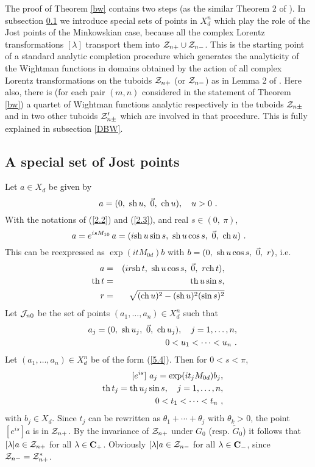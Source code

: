 \documentclass[a4paper,a4paper]{article}
\def\bC{{\bf C}}
\def\th{{\rm th\,}}
\def\ch{{\rm ch\,}}
\def\sh{{\rm sh\,}}
\def\JJ{{\cal J}}
\def\ZZ{{\cal Z}}
\def\wt{\widetilde}
\def\Xdn{X_d^n}
\begin{document}
\vskip 0.2cm
The proof of Theorem \ref{bw} contains two steps (as the similar
Theorem 2 of \cite{BEM}). In subsection \ref{Jostpt} we introduce
special sets of points in $X_d^n$ which play the role of the
Jost points of the Minkowskian case, because
all the complex Lorentz transformations $[\lambda]$
transport them into $\ZZ_{n+}\cup\ZZ_{n-}$.
This is the starting point of a standard analytic
completion procedure which generates the analyticity of the
Wightman functions in domains obtained by the action of all
complex Lorentz transformations on the tuboids
$\ZZ_{n+}$
(or $\ZZ_{n-}$) as in Lemma 2 of \cite{BEM}.
Here also, there is (for each pair $(m,n)$ considered in the statement of
Theorem \ref{bw}) a quartet of Wightman functions analytic
respectively in the tuboids
$\ZZ_{n\pm}$
and in two other tuboids
$\ZZ'_{n\pm}$
which are involved in that procedure. This is
fully explained in subsection \ref{DBW}.


\subsection{A special set of Jost points}

\label{Jostpt}
Let $a \in X_d$ be given by
\begin{equation}
a = (0,\ \sh u,\ \vec{0},\ \ch u),\ \ \ u > 0\ .
\label{5.1}\end{equation}
With the notations of (\ref{2.2}) and (\ref{2.3}), and real $s \in (0,\ \pi)$,
\begin{equation}
[e^{is}]\,a = e^{isM_{10}}\,a =
(i\sh u \sin s,\ \sh u \cos s,\ \vec{0},\ \ch u)\ .
\label{5.2}\end{equation}
This can be reexpressed as $\exp(itM_{0d})b$ with
$b = (0,\ \sh u \cos s,\ \vec{0},\ r)$, i.e.
\begin{eqnarray}
[e^{is}]\,a &=& (ir\sh t,\ \sh u \cos s,\ \vec{0},\ r\ch t),\nonumber\\
\th t &=& \th u \sin s,\nonumber\\
r &=& \sqrt{(\ch u)^2 -(\sh u)^2 (\sin s)^2}
\label{5.3}\end{eqnarray}
Let $\JJ_{n0}$ be the set of points $(a_1,\ldots,a_n) \in \Xdn$
such that
\begin{eqnarray}
&& a_j = (0,\ \sh u_j,\ \vec{0},\ \ch u_j),\ \ \ j = 1,\ldots, n,\nonumber\\
&& 0 < u_1 <\cdots < u_n\ .
\label{5.4}\end{eqnarray}
Let $(a_1,\ldots,a_n) \in \Xdn$ be of the form (\ref{5.4}). Then for
$0<s <\pi$,
\begin{eqnarray}
&& [e^{is}]\ a_j = \exp(it_j M_{0d})b_j,\nonumber\\
&& \th t_j = \th u_j \sin s,\ \ \ j = 1,\ldots, n,\nonumber\\
&& 0 < t_1 < \cdots < t_n\ ,
\label{5.5}\end{eqnarray}
with $b_j \in X_d$.
Since $t_j$ can be rewritten as $\theta_1 + \cdots + \theta_j$ with
$\theta_k >0$, the point $[e^{is}]a$ is in $\ZZ_{n+}$.
By the invariance of $\ZZ_{n+}$ under $G_0$ (resp. $\wt G_0$) it follows
that $[\lambda] a \in \ZZ_{n+}$ for all $\lambda \in \bC_+$. Obviously
$[\lambda] a \in \ZZ_{n-}$ for all $\lambda \in \bC_-$, since
$\ZZ_{n-} = \ZZ_{n+}^*$.
\end{document}
